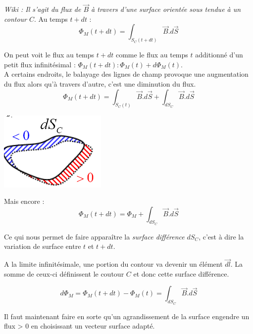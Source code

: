 \documentclass	[11pt, a4paper, openany]{book}
\begin{document}
\textit{Wiki : Il s'agit du flux de $\vec{B}$ à travers d'une surface orientée sous tendue à un contour $C$}.
Au temps $t+dt$ :
\begin{equation}
	\Phi_M(t+dt)= \int_{S_C(t+dt)} \vec{B}.d\vec{S}
\end{equation}

On peut voit le flux au temps $t+dt$ comme le flux au temps $t$ additionné d'un petit flux infinitésimal : $\Phi_M(t+dt) : \Phi_M(t) + d\Phi_M(t)$.\\

A certains endroits, le balayage des lignes de champ provoque une augmentation du flux alors qu'à travers d'autre, c'est une diminution du flux. 
\begin{equation}
	\Phi_M(t+dt) = \int_{S_C(t)} \vec{B}.d\vec{S} + \int_{dS_C} \vec{B}.d\vec{S}
\end{equation}

\begin{center}
	\includegraphics[scale=0.45]{em/image29.png}\\
\end{center}
Mais encore : 
\begin{equation}
	\Phi_M(t+dt) = \Phi_M + \int_{dS_C} \vec{B}.d\vec{S}
\end{equation}


Ce qui nous permet de faire apparaître la \textit{surface différence} $dS_C$, c'est à dire la variation de surface entre $t$ et $t+dt$.

A la limite infinitésimale, une portion du contour va devenir un élément $\vec{dl}$. La somme de ceux-ci définissent le coutour $C$ et donc cette surface différence.

\begin{equation}
	d\Phi_M = \Phi_M(t+dt) - \Phi_M(t) = \int_{dS_C} \vec{B}.d\vec{S}
\end{equation}

Il faut maintenant faire en sorte qu'un agrandissement de la surface engendre un flux > 0 en choisissant un vecteur surface adapté.\\
\end{document}
